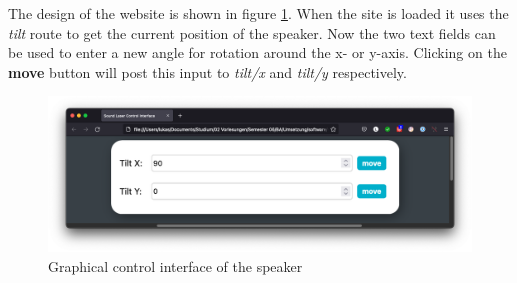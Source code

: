 %
The design of the website is shown in figure \ref{fig:software:mov:website}. When the site is loaded it uses the \textit{tilt} route to get the current position of the speaker. Now the two text fields can be used to enter a new angle for rotation around the x- or y-axis. Clicking on the \textbf{move} button will post this input to \textit{tilt/x} and \textit{tilt/y} respectively.
%
\begin{figure}[ht]
  \centering
  \includegraphics[height=\smallheight]{src/assets/pictures/software/control_interface_xl.png}
  \caption{Graphical control interface of the speaker}\label{fig:software:mov:website}
\end{figure}